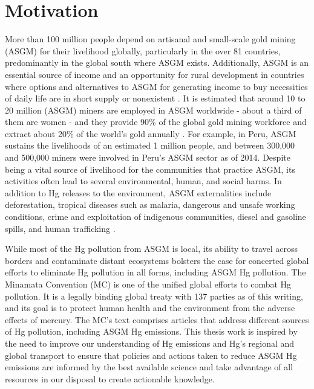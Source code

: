 \section{Motivation}
\begin{flushleft}
More than 100 million people depend on artisanal and small-scale gold mining (ASGM) for their livelihood globally, particularly in the over 81 countries, predominantly in the global south where ASGM exists\cite{planetgold_planetgold_2021}. Additionally, ASGM is an essential source of income and an opportunity for rural development in countries where options and alternatives to ASGM for generating income to buy necessities of daily life are in short supply or nonexistent \cite{planetgold_planetgold_2021}. It is estimated that around 10 to 20 million (ASGM) miners are employed in ASGM worldwide - about a third of them are women - and they provide 90\% of the global gold mining workforce and extract about 20\% of the world's gold annually \cite{planetgold_planetgold_2021}. For example, in Peru, ASGM sustains the livelihoods of an estimated 1 million people, and between 300,000 and 500,000 miners were involved in Peru's ASGM sector as of 2014. Despite being a vital source of livelihood for the communities that practice ASGM, its activities often lead to several environmental, human, and social harms. In addition to Hg releases to the environment, ASGM externalities include deforestation, tropical diseases such as malaria, dangerous and unsafe working conditions, crime and exploitation of indigenous communities, diesel and gasoline spills, and human trafficking \cite{usaid_usaid_2020}. 
\end{flushleft}
\begin{flushleft}
While most of the Hg pollution from ASGM is local, its ability to travel across borders and contaminate distant ecosystems bolsters the case for concerted global efforts to eliminate Hg pollution in all forms, including ASGM Hg pollution. The Minamata Convention (MC) is one of the unified global efforts to combat Hg pollution. It is a legally binding global treaty with 137 parties as of this writing, and its goal is to protect human health and the environment from the adverse effects of mercury. The MC's text comprises articles that address different sources of Hg pollution, including ASGM Hg emissions\cite{unep_minamata_2013}. This thesis work is inspired by the need to improve our understanding of Hg emissions and Hg's regional and global transport to ensure that policies and actions taken to reduce ASGM Hg emissions are informed by the best available science and take advantage of all resources in our disposal to create actionable knowledge.
\end{flushleft}


